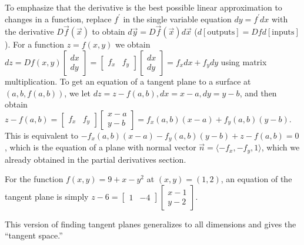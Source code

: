 To emphasize that the derivative is the best possible linear
approximation to changes in a function, replace $f^\prime$ in the single
variable equation $dy=f^\prime dx$ with the derivative $D\vec f(\vec x)$ to
obtain $d\vec y =D\vec f(\vec x)d\vec x$ ($d[\text{outputs}]=Df
d[\text{inputs}]$).  For a function $z=f(x,y)$ we obtain
$dz=Df(x,y)\begin{bmatrix}dx\\dy\end{bmatrix} =
\begin{bmatrix}f_x&f_y\end{bmatrix}\begin{bmatrix}dx\\dy\end{bmatrix}
= f_xdx+f_ydy$ using matrix multiplication. To get an equation of a
tangent plane to a surface at $(a,b,f(a,b))$, we let $dz=z-f(a,b),
dx=x-a,dy=y-b$, and then obtain $z-f(a,b) =
\begin{bmatrix}f_x&f_y\end{bmatrix}\begin{bmatrix}x-a\\y-b\end{bmatrix}=f_x(a,b)
(x-a)+f_y(a,b)(y-b)$. This is equivalent to  $-f_x(a,b)
(x-a)-f_y(a,b)(y-b)+z-f(a,b)=0$, which is the equation of a plane with
normal vector $\vec n=\langle-f_x,-f_y,1\rangle$, which we already
obtained in the partial derivatives section. 

\begin{example}
For the function
$f(x,y)=9+x-y^2$ at $(x,y)=(1,2)$, an equation of the tangent plane is
simply  $z-6 =
\begin{bmatrix}1&-4\end{bmatrix}\begin{bmatrix}x-1\\y-2\end{bmatrix}$. 
\end{example}

This version of finding tangent planes generalizes to all dimensions
and gives the ``tangent space.''

